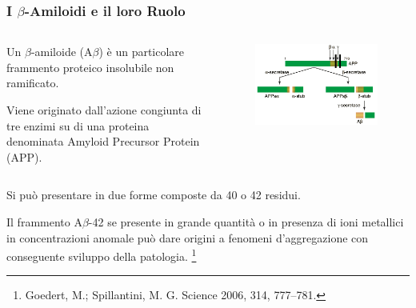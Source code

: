 \documentclass[9pt]{beamer}
\newcommand\blfootnote[1]{%
	\begingroup
	\renewcommand\thefootnote{}\footnote{#1}%
	\addtocounter{footnote}{-1}%
	\endgroup
}
\begin{document}
\begin{frame}
	\frametitle{I $\beta$-Amiloidi e il loro Ruolo}
	\bigskip
	\begin{columns}
		\begin{column}{0.5\textwidth}
			Un $\beta$-amiloide (A$\beta$) è un particolare frammento proteico insolubile non ramificato.
			
			\smallskip
			Viene originato dall'azione congiunta di tre enzimi su di una proteina denominata Amyloid Precursor Protein (APP).
		\end{column}
		\begin{column}{0.5\textwidth}
			
			\begin{figure}
				\includegraphics[width=\textwidth]{immagini/APP.png}
			\end{figure}
		\end{column}
	\end{columns}
	
	\medskip
	Si può presentare in due forme composte da 40 o 42 residui.
	
	Il frammento A$\beta$-42 se presente in grande quantità o in presenza di ioni metallici in concentrazioni anomale può dare origini a fenomeni d'aggregazione con conseguente sviluppo della patologia. \blfootnote{Goedert, M.; Spillantini, M. G. Science 2006, 314, 777–781.}
	
\end{frame}
\end{document}

